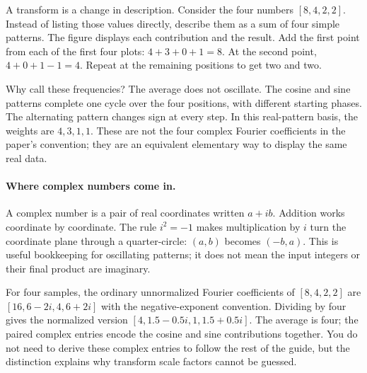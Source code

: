 
A transform is a change in description. Consider the four numbers
$[8,4,2,2]$. Instead of listing those values directly, describe them as a
sum of four simple patterns. The figure displays each contribution and the
result. Add the first point from each of the first four plots: $4+3+0+1=8$.
At the second point, $4+0+1-1=4$. Repeat at the remaining positions to get
two and two.


Why call these frequencies? The average does not oscillate. The cosine and
sine patterns complete one cycle over the four positions, with different
starting phases. The alternating pattern changes sign at every step.
In this real-pattern basis, the weights are $4,3,1,1$. These are not the
four complex Fourier coefficients in the paper's convention; they are an
equivalent elementary way to display the same real data.

\paragraph{Where complex numbers come in.}
A complex number is a pair of real coordinates written $a+ib$.
Addition works coordinate by coordinate. The rule $i^2=-1$ makes
multiplication by $i$ turn the coordinate plane through a quarter-circle:
$(a,b)$ becomes $(-b,a)$. This is useful bookkeeping for oscillating patterns;
it does not mean the input integers or their final product are imaginary.


For four samples, the ordinary unnormalized Fourier coefficients of
$[8,4,2,2]$ are $[16,6-2i,4,6+2i]$ with the negative-exponent convention.
Dividing by four gives the normalized version
$[4,1.5-0.5i,1,1.5+0.5i]$. The average is four; the paired complex entries
encode the cosine and sine contributions together. You do not need to derive
these complex entries to follow the rest of the guide, but the distinction
explains why transform scale factors cannot be guessed.

